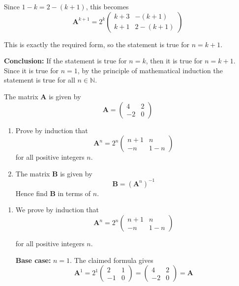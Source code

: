 \documentclass[leqno]{article}
\begin{document}
\begin{enumerate}[
  label=\textbf{\arabic*.},
  leftmargin=*,
  topsep=0pt,
  partopsep=0pt,
  parsep=0pt
]
\begin{djsSolution}
Since \(1-k=2-(k+1)\), this becomes
\[
\mathbf{A}^{k+1}
=
2^{k}
\begin{pmatrix}
k+3 & -(k+1)\\
k+1 & 2-(k+1)
\end{pmatrix}
\]

This is exactly the required form, so the statement is true for \(n=k+1\).

\textbf{Conclusion:} If the statement is true for \(n=k\), then it is true for \(n=k+1\). Since it is true for \(n=1\), by the principle of mathematical induction the statement is true for all \(n\in\mathbb{N}\).
\end{djsSolution}


\newpage

\questionitem

The matrix $\mathbf{A}$ is given by
\[
\mathbf{A} = \begin{pmatrix} 4 & 2 \\ -2 & 0 \end{pmatrix}
\]
\begin{enumerate}[label=\textbf{(\alph*)}]
  \item Prove by induction that
  \[
  \mathbf{A}^n = 2^n \begin{pmatrix} n+1 & n \\ -n & 1-n \end{pmatrix}
  \]
  for all positive integers $n$.  \\
  \item The matrix $\mathbf{B}$ is given by
  \[
  \mathbf{B} = (\mathbf{A}^n)^{-1}
  \]
  Hence find $\mathbf{B}$ in terms of $n$.  \\
\end{enumerate}

\vspace*{10pt}

\begin{djsSolution}
\begin{enumerate}[label=\textbf{(\alph*)}]
  \item We prove by induction that
\[
\mathbf{A}^n=2^n\begin{pmatrix}n+1&n\\-n&1-n\end{pmatrix}
\]

for all positive integers $n$.

\textbf{Base case:} $n=1$. The claimed formula gives
\[
\mathbf{A}^1=2^1\begin{pmatrix}2&1\\-1&0\end{pmatrix}
=\begin{pmatrix}4&2\\-2&0\end{pmatrix}
=\mathbf{A}
\]


\end{enumerate}
\end{djsSolution}
\end{enumerate}
\end{document}
